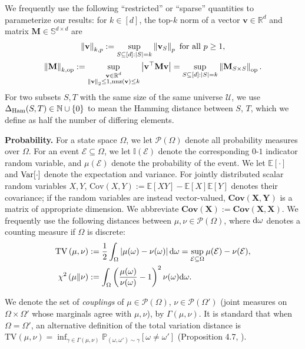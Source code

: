 \documentclass[11pt]{article}
\newcommand{\defeq}{:=}
\newcommand{\norm}[1]{\left\lVert#1\right\rVert}
\newcommand{\normop}[1]{\left\lVert#1\right\rVert_{\textup{op}}}
\newcommand{\R}{\mathbb{R}}
\newcommand{\N}{\mathbb{N}}
\newcommand{\half}{\frac{1}{2}}
\newcommand{\1}{\mathbf{1}}
\newcommand{\0}{\mathbf{0}}
\newcommand{\ind}{\mathbb{I}}
\newcommand{\E}{\mathbb{E}}
\newcommand{\Var}{\textup{Var}}
\newcommand{\dham}{\Delta_{\textup{Ham}}}
\newcommand{\dd}{\textup{d}}
\newcommand{\Par}[1]{\left(#1\right)}
\newcommand{\Abs}[1]{\left|#1\right|}
\newcommand{\Cov}{\mathbf{Cov}}
\newcommand{\Sym}{\mathbb{S}}
\newcommand{\nnz}{\mathrm{nnz}}
\newcommand{\vX}{\bm{X}}
\newcommand{\vY}{\bm{Y}}
\newcommand{\sCov}{\mathrm{Cov}}
\newcommand{\TV}[1]{\mathrm{TV}\left(#1\right)}
\newcommand{\CS}[2]{\chi^2\left(#1\|#2\right)}
\newcommand{\Prob}{\mathbb{P}}
\renewcommand{\Pr}{\Prob}
\newcommand{\mm}{{\mathbf{M}}}
\newcommand{\normkop}[2]{{\left\lVert#1\right\rVert_{#2, \textup{op}}}}
\newcommand{\vv}{{\mathbf{v}}}
\newcommand{\calE}{{\mathcal{E}}}
\newcommand{\calP}{{\mathcal{P}}}
\newcommand{\calU}{{\mathcal{U}}}
\begin{document}
We frequently use the following ``restricted'' or ``sparse'' quantities to parameterize our results: for $k \in [d]$, the top-$k$ norm of a vector $\vv \in \R^d$ and matrix $\mm \in \Sym^{d \times d}$ are
\begin{equation}\label{eq:sparse_norm_def}\begin{gathered}\norm{\vv}_{k, p} \defeq \sup_{\substack{S \subseteq [d]: |S| = k}} \norm{\vv_S}_p\text{ for all } p \ge 1,\\ \normkop{\mm}{k} \defeq \sup_{\substack{\vv \in \R^d \\ \norm{\vv}_2 \le 1,\nnz(\vv) \le k}} \Abs{\vv^\top \mm \vv} = \sup_{S \subseteq [d]: |S| = k} \normop{\mm_{S \times S}}. \end{gathered}\end{equation}
For two subsets $S, T$ with the same size of the same universe $\calU$, we use $\dham(S, T) \in \N \cup \{0 \}$ to mean the Hamming distance between $S$, $T$, which we define as half the number of differing elements.

\textbf{Probability.} For a state space $\Omega$, we let $\calP(\Omega)$ denote all probability measures over $\Omega$. For an event $\calE \subseteq \Omega$, we let $\ind(\calE)$ denote the corresponding $0$-$1$ indicator random variable, and $\mu(\calE)$ denote the probability of the event.
 We let $\E[\cdot]$ and $\Var[\cdot]$ denote the expectation and variance. For jointly distributed scalar random variables $X, Y$, $\sCov(X, Y) \defeq \E[XY] - \E[X]\E[Y]$ denotes their covariance; if the random variables are instead vector-valued, $\Cov(\vX, \vY)$ is a matrix of appropriate dimension. We abbreviate $\Cov(\vX) \defeq \Cov(\vX, \vX)$. We frequently use the following distances between $\mu, \nu \in \calP(\Omega)$, where $\dd \omega$ denotes a counting measure if $\Omega$ is discrete:
\begin{align*}
\TV{\mu, \nu} &\defeq \half \int_\Omega \Abs{\mu(\omega) - \nu(\omega)} \dd \omega = \sup_{\calE \subseteq \Omega} \mu(\calE) - \nu(\calE),\\
\CS{\mu}{\nu} &\defeq \int_\Omega \Par{\frac{\mu(\omega)}{\nu(\omega)} - 1}^2\nu(\omega) \dd \omega.
\end{align*}

We denote the set of \emph{couplings} of $\mu \in \calP(\Omega)$, $\nu \in \calP(\Omega')$ (joint measures on $\Omega \times \Omega'$ whose marginals agree with $\mu, \nu$), by $\Gamma(\mu, \nu)$. It is standard that when $\Omega = \Omega'$, an alternative definition of the total variation distance is $\TV{\mu, \nu} = \inf_{\gamma \in \Gamma(\mu, \nu)}\Pr_{(\omega, \omega') \sim \gamma}[\omega \neq \omega']$ (Proposition 4.7, \cite{LevinPW09}).
\end{document}
